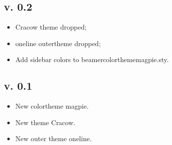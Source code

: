 \documentclass[12pt]{article}
\begin{document}
\subsection*{v. 0.2}
\begin{itemize}
   \item Cracow theme dropped; 
   \item oneline outertheme dropped;
   \item Add sidebar colors to \ttfamily{}beamercolorthememagpie.sty\rmfamily{}.
\end{itemize}

\subsection*{v. 0.1}
\begin{itemize}
   \item New colortheme \ttfamily{}magpie\rmfamily{}. 
   \item New theme \ttfamily{}Cracow\rmfamily{}.
   \item New outer theme \ttfamily{}oneline\rmfamily{}.
\end{itemize}
\end{document}
